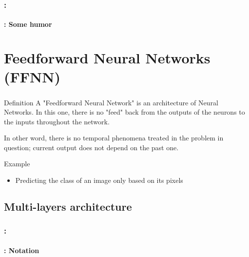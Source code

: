 \documentclass[xcolor=table]{beamer}
\begin{document}
\begin{frame}
	\frametitle{\insertshortsubtitle: \insertsection}
	\framesubtitle{\insertsubsection: Some humor}
	
	\begin{center}
	\end{center}
	
\end{frame}

\section{Feedforward Neural Networks (FFNN)}

\begin{frame}
	\frametitle{\insertshortsubtitle}
	\framesubtitle{\insertsection}
	
	\begin{block}{Definition}
		\vspace{6pt}
		A "Feedforward Neural Network" is an architecture of Neural Networks. 
		In this one, there is no "feed" back from the outputs of the neurons to the inputs throughout the network. \cite{2006-sazli}
		
		\vspace{6pt}
		In other word, there is no temporal phenomena treated in the problem in question; current output does not depend on the past one.
		\vspace{6pt}
	\end{block}
	
	\begin{exampleblock}{Example}
		\begin{itemize}
			\item Predicting the class of an image only based on its pixels 
		\end{itemize}
	\end{exampleblock}
	
\end{frame}

\subsection{Multi-layers architecture}

\begin{frame}
	\frametitle{\insertshortsubtitle: \insertsection}
	\framesubtitle{\insertsubsection: Notation}

	\begin{center}
	\end{center}

\end{frame}
\end{document}
